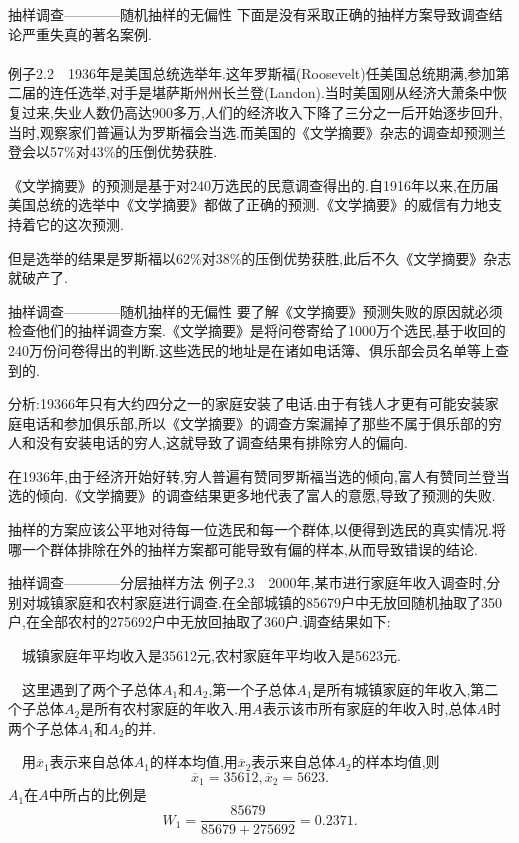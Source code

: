\begin{frame}{抽样调查————随机抽样的无偏性}
下面是没有采取正确的抽样方案导致调查结论严重失真的著名案例.
\\ \hspace*{\fill} \\
例子2.2$\quad$1936年是美国总统选举年.这年罗斯福(Roosevelt)任美国总统期满,参加第二届的连任选举,对手是堪萨斯州州长兰登(Landon).当时美国刚从经济大萧条中恢复过来,失业人数仍高达900多万,人们的经济收入下降了三分之一后开始逐步回升,当时,观察家们普遍认为罗斯福会当选.而美国的《文学摘要》杂志的调查却预测兰登会以57\%对43\%的压倒优势获胜.

《文学摘要》的预测是基于对240万选民的民意调查得出的.自1916年以来,在历届美国总统的选举中《文学摘要》都做了正确的预测.《文学摘要》的威信有力地支持着它的这次预测.

但是选举的结果是罗斯福以62\%对38\%的压倒优势获胜,此后不久《文学摘要》杂志就破产了.

\end{frame}

\begin{frame}{抽样调查————随机抽样的无偏性}
要了解《文学摘要》预测失败的原因就必须检查他们的抽样调查方案.《文学摘要》是将问卷寄给了1000万个选民,基于收回的240万份问卷得出的判断.这些选民的地址是在诸如电话簿、俱乐部会员名单等上查到的.

分析:19366年只有大约四分之一的家庭安装了电话.由于有钱人才更有可能安装家庭电话和参加俱乐部,所以《文学摘要》的调查方案漏掉了那些不属于俱乐部的穷人和没有安装电话的穷人,这就导致了调查结果有排除穷人的偏向.

在1936年,由于经济开始好转,穷人普遍有赞同罗斯福当选的倾向,富人有赞同兰登当选的倾向.《文学摘要》的调查结果更多地代表了富人的意愿,导致了预测的失败.

抽样的方案应该公平地对待每一位选民和每一个群体,以便得到选民的真实情况.将哪一个群体排除在外的抽样方案都可能导致有偏的样本,从而导致错误的结论.
\end{frame}

\begin{frame}{抽样调查————分层抽样方法}
例子2.3$\quad$2000年,某市进行家庭年收入调查时,分别对城镇家庭和农村家庭进行调查.在全部城镇的85679户中无放回随机抽取了350户,在全部农村的275692户中无放回抽取了360户.调查结果如下:

$\quad$城镇家庭年平均收入是35612元,农村家庭年平均收入是5623元.

$\quad$这里遇到了两个子总体$A_1$和$A_2$,第一个子总体$A_1$是所有城镇家庭的年收入,第二个子总体$A_2$是所有农村家庭的年收入.用$A$表示该市所有家庭的年收入时,总体$A$时两个子总体$A_1$和$A_2$的并.

$\quad$用$\overline{x}_1$表示来自总体$A_1$的样本均值,用$\overline{x}_2$表示来自总体$A_2$的样本均值,则
\begin{equation*}
\overline{x}_1 = 35612,\overline{x}_2 = 5623.
\end{equation*}
$A_1$在$A$中所占的比例是
\begin{equation*}
W_1 = \frac{85679}{85679+275692} = 0.2371.
\end{equation*}
\end{frame}

